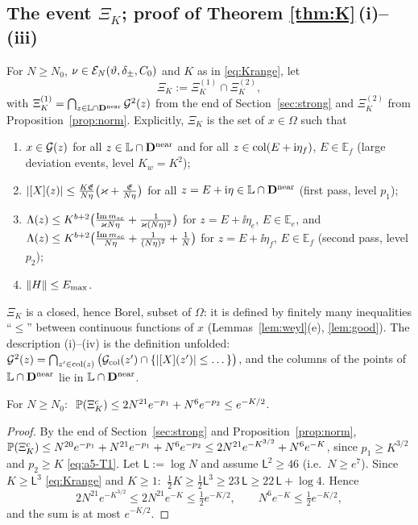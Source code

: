 \subsection{The event \texorpdfstring{$\Xi_K$}{Xi\_K}; proof of Theorem \ref{thm:K}\,(i)--(iii)}\label{sec:XiK}
\begin{definition}\label{def:XiK}
For $N\ge N_0$, $\nu\in\mathcal E_N(\vartheta,\delta_\pm,C_0)$ and $K$ as in \eqref{eq:Krange}, let
\[
 \Xi_K:=\Xi_K^{(1)}\cap\Xi_K^{(2)},
\]
with $\Xi_K^{(1)}=\bigcap_{z\in\mathbb L\cap\mathbf{D}^{\rm near}}\mathcal{G}^2(z)$ from the end of Section~\ref{sec:strong} and $\Xi_K^{(2)}$ from Proposition~\ref{prop:norm}. Explicitly, $\Xi_K$ is the set of $x\in\Omega$ such that
\begin{enumerate}[label=\textup{(\roman*)},leftmargin=2.2em,itemsep=0pt]
\item $x\in\mathcal{G}(z)$ for all $z\in\mathbb L\cap\mathbf{D}^{\rm near}$ and for all $z\in{\rm col}(E+\mathrm{i}\eta_f)$, $E\in\mathbb E_f$ \quad(large deviation events, level $K_w=K^2$);
\item $|[X](z)|\le\frac{K\mathfrak E}{N\eta}\big(\varkappa+\frac{\mathfrak E}{N\eta}\big)$ for all $z=E+\mathrm{i}\eta\in\mathbb L\cap\mathbf{D}^{\rm near}$ \quad(first pass, level $p_1$);
\item $\Lambda(z)\le K^{b+2}\big(\frac{\operatorname{Im}m_{sc}}{\varkappa N\eta}+\frac1{\varkappa(N\eta)^2}\big)$ for $z=E+\ii\eta_e$, $E\in\mathbb E_e$, and $\Lambda(z)\le K^{b+2}\big(\frac{\operatorname{Im}m_{sc}}{N\eta}+\frac1{(N\eta)^2}+\frac1N\big)$ for $z=E+\ii\eta_f$, $E\in\mathbb E_f$ \quad(second pass, level $p_2$);
\item $\|H\|\le E_{\max}$.
\end{enumerate}
\end{definition}
\noindent $\Xi_K$ is a closed, hence Borel, subset of $\Omega$: it is defined by finitely many inequalities ``$\le$'' between continuous functions of $x$ (Lemmas~\ref{lem:weyl}(e), \ref{lem:good}). The description (i)--(iv) is the definition unfolded:
$\mathcal{G}^2(z)=\bigcap_{z'\in{\rm col}(z)}\big(\mathcal{G}_{\rm col}(z')\cap\{|[X](z')|\le\dots\}\big)$, and the columns of the points of $\mathbb L\cap\mathbf{D}^{\rm near}$ lie in $\mathbb L\cap\mathbf{D}^{\rm near}$.

\begin{proposition}[Probability of $\Xi_K$]\label{prop:XiK}
For $N\ge N_0$: $\ \PP(\Xi_K^c)\le2N^{21}e^{-p_1}+N^6e^{-p_2}\le e^{-K/2}$.
\end{proposition}
\begin{proof}
By the end of Section~\ref{sec:strong} and Proposition~\ref{prop:norm}, $\mathbb{P}(\Xi_K^c)\le N^{20}e^{-p_1}+N^{21}e^{-p_1}+N^6e^{-p_2}\le2N^{21}e^{-K^{3/2}}+N^6e^{-K}$, since $p_1\ge K^{3/2}$ and $p_2\ge K$ \eqref{eq:a5-T1}.
Let $\mathsf L:=\log N$ and assume $\mathsf L^2\ge46$ (i.e.\ $N\ge e^{7}$). Since $K\ge\mathsf L^3$ \eqref{eq:Krange} and $K\ge1$: $\ \frac12K\ge\frac12\mathsf L^3\ge23\,\mathsf L\ge22\,\mathsf L+\log4$. Hence
\[
 2N^{21}e^{-K^{3/2}}\le2N^{21}e^{-K}\le\tfrac12e^{-K/2},\qquad N^6e^{-K}\le\tfrac12e^{-K/2},
\]
and the sum is at most $e^{-K/2}$.
\end{proof}

